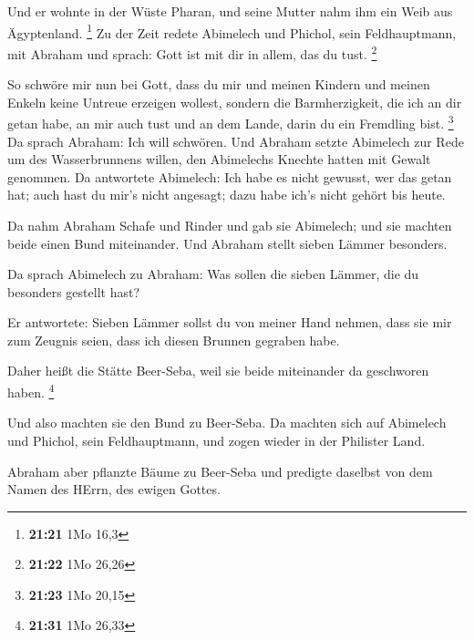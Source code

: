  Und er wohnte in der Wüste Pharan, und seine Mutter nahm
ihm ein Weib aus Ägyptenland. \footnote{\textbf{21:21} 1Mo 16,3}
 Zu der Zeit redete Abimelech und Phichol, sein
Feldhauptmann, mit Abraham und sprach: Gott ist mit dir in allem, das du
tust. \footnote{\textbf{21:22} 1Mo 26,26}

 So schwöre mir nun bei Gott, dass du mir und meinen
Kindern und meinen Enkeln keine Untreue erzeigen wollest, sondern die
Barmherzigkeit, die ich an dir getan habe, an mir auch tust und an dem
Lande, darin du ein Fremdling bist. \footnote{\textbf{21:23} 1Mo 20,15}
 Da sprach Abraham: Ich will schwören.  Und
Abraham setzte Abimelech zur Rede um des Wasserbrunnens willen, den
Abimelechs Knechte hatten mit Gewalt genommen.  Da
antwortete Abimelech: Ich habe es nicht gewusst, wer das getan hat; auch
hast du mir's nicht angesagt; dazu habe ich's nicht gehört bis heute.

 Da nahm Abraham Schafe und Rinder und gab sie Abimelech;
und sie machten beide einen Bund miteinander.  Und Abraham
stellt sieben Lämmer besonders.

 Da sprach Abimelech zu Abraham: Was sollen die sieben
Lämmer, die du besonders gestellt hast?

 Er antwortete: Sieben Lämmer sollst du von meiner Hand
nehmen, dass sie mir zum Zeugnis seien, dass ich diesen Brunnen gegraben
habe.

 Daher heißt die Stätte Beer-Seba, weil sie beide
miteinander da geschworen haben. \footnote{\textbf{21:31} 1Mo 26,33}

 Und also machten sie den Bund zu Beer-Seba. Da machten
sich auf Abimelech und Phichol, sein Feldhauptmann, und zogen wieder in
der Philister Land.

 Abraham aber pflanzte Bäume zu Beer-Seba und predigte
daselbst von dem Namen des HErrn, des ewigen Gottes.

